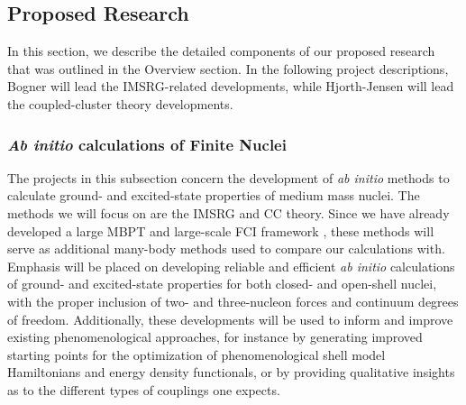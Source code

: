 \subsection{Proposed Research}


In this section, we describe the detailed components of our proposed research that was 
outlined in the Overview section. In the following project descriptions, Bogner will lead the 
IMSRG-related developments, while Hjorth-Jensen will lead the coupled-cluster theory developments.



\subsubsection{{\em Ab initio} calculations of Finite Nuclei}\label{subsec:finitenuclei}

The projects in this subsection concern the development of {\em ab
  initio} methods to calculate ground- and excited-state properties of
medium mass nuclei. The methods we will focus on are the IMSRG and CC theory. Since we
have already developed a large MBPT and large-scale FCI framework \cite{Hjorth-Jensen:1995ys,mhj2004,Tsunoda:2013bla,Tsunoda:2016fjh}, these methods will serve as
additional many-body methods used to compare our calculations with.
Emphasis will be placed on developing reliable and efficient {\em ab initio}
calculations of ground- and excited-state properties for both closed-
and open-shell nuclei, with the proper inclusion of two- and
three-nucleon forces and continuum degrees of freedom.  Additionally,
these developments will be used to inform and improve existing
phenomenological approaches, for instance by generating improved
starting points for the optimization of phenomenological shell model
Hamiltonians and energy density functionals, or by providing
qualitative insights as to the different types of couplings one
expects.



